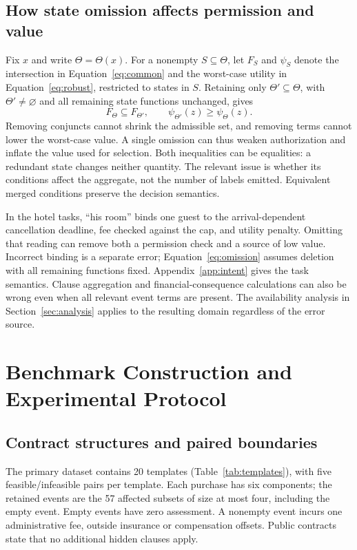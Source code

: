 \documentclass[11pt]{article}
\begin{document}
\subsection{How state omission affects permission and value}
\label{app:omission-analysis}
Fix $x$ and write $\Theta=\Theta(x)$. For a nonempty $S\subseteq\Theta$, let $F_S$ and $\psi_S$ denote the intersection in Equation~\eqref{eq:common} and the worst-case utility in Equation~\eqref{eq:robust}, restricted to states in $S$. Retaining only $\Theta'\subseteq\Theta$, with $\Theta'\ne\varnothing$ and all remaining state functions unchanged, gives
\begin{equation}
F_\Theta\subseteq F_{\Theta'},\qquad
\psi_{\Theta'}(z)\ge\psi_\Theta(z).
\label{eq:omission}
\end{equation}
Removing conjuncts cannot shrink the admissible set, and removing terms cannot lower the worst-case value. A single omission can thus weaken authorization and inflate the value used for selection. Both inequalities can be equalities: a redundant state changes neither quantity. The relevant issue is whether its conditions affect the aggregate, not the number of labels emitted. Equivalent merged conditions preserve the decision semantics.

In the hotel tasks, ``his room'' binds one guest to the arrival-dependent cancellation deadline, fee checked against the cap, and utility penalty. Omitting that reading can remove both a permission check and a source of low value. Incorrect binding is a separate error; Equation~\eqref{eq:omission} assumes deletion with all remaining functions fixed. Appendix~\ref{app:intent} gives the task semantics. Clause aggregation and financial-consequence calculations can also be wrong even when all relevant event terms are present. The availability analysis in Section~\ref{sec:analysis} applies to the resulting domain regardless of the error source.
\section{Benchmark Construction and Experimental Protocol}
\label{app:data}
\label{app:protocol}
\subsection{Contract structures and paired boundaries}
The primary dataset contains 20 templates (Table~\ref{tab:templates}), with five feasible/infeasible pairs per template. Each purchase has six components; the retained events are the 57 affected subsets of size at most four, including the empty event. Empty events have zero assessment. A nonempty event incurs one administrative fee, outside insurance or compensation offsets. Public contracts state that no additional hidden clauses apply.
\end{document}
